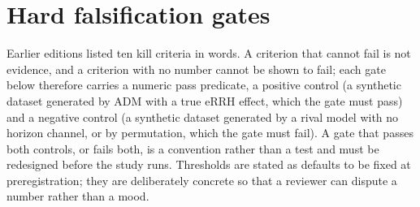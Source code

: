 \documentclass[9pt,twocolumn]{article}
\begin{document}
\section{Hard falsification gates}
\label{sec:gates}
Earlier editions listed ten kill criteria in words. A criterion that cannot fail is not evidence, and a criterion with no number cannot be shown to fail; each gate below therefore carries a numeric pass predicate, a positive control (a synthetic dataset generated by ADM with a true eRRH effect, which the gate must pass) and a negative control (a synthetic dataset generated by a rival model with no horizon channel, or by permutation, which the gate must fail). A gate that passes both controls, or fails both, is a convention rather than a test and must be redesigned before the study runs. Thresholds are stated as defaults to be fixed at preregistration; they are deliberately concrete so that a reviewer can dispute a number rather than a mood.
\end{document}
